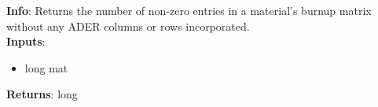 \textbf{Info}: Returns the number of non-zero entries in a material's burnup matrix
 without any ADER columns or rows incorporated. \\

\noindent \textbf{Inputs}:
\begin{itemize}
\item{long mat}
\end{itemize}

\noindent \textbf{Returns}: long
